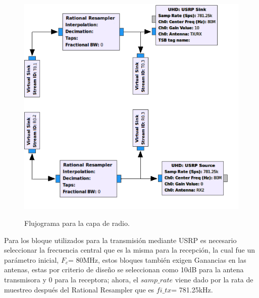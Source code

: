 \vspace{400px}
\begin{figure}[h!]
	\captionsetup{justification = raggedright, singlelinecheck = false}
	\caption{Flujograma para la capa de radio.} 
	\centering
	\includegraphics[scale=0.8]{Imagenes/4.png}
	\label{fig:ej1_caparf_flujo}
\end{figure}

Para los bloque utilizados para la transmisión mediante USRP es necesario seleccionar la frecuencia central que es la misma para la recepción, la cual fue un parámetro inicial, $F_{c}$= 80MHz, estos bloques también exigen Ganancias en las antenas, estas por criterio de diseño se seleccionan como 10dB para la antena transmisora y 0 para la receptora; ahora, el $samp\_rate$ viene dado por la rata de muestreo después del Rational Resampler que es $fi\_tx$= 781.25kHz.






